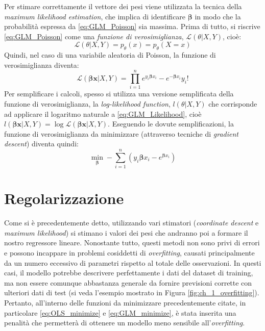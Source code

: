 Per stimare correttamente il vettore dei pesi viene utilizzata la tecnica della \textit{maximum likelihood 
estimation}, che implica di identificare $\bm{\beta}$ in modo che la probabilità espressa da \eqref{eq:GLM_Poisson} sia
massima. Prima di tutto, si riscrive \eqref{eq:GLM_Poisson} come una \textit{funzione di verosimiglianza}, $\mathcal{L}(\theta | X, Y)$, cioè:
\begin{equation}
\mathcal{L}(\theta | X, Y) = p_{\theta}(x) = p_{\theta}(X=x)
\end{equation}
Quindi, nel caso di una variabile aleatoria di Poisson, la funzione di verosimiglianza diventa:
\begin{equation}
\mathcal{L}(\bm{\beta x}  | X, Y ) = \prod_{i=1}^n {e^{y_i \bm{\beta} x_i}-e^{-\bm{\beta} x_i}}{y_i!} \label{eq:GLM_Likelihood}
\end{equation}
Per semplificare i calcoli, spesso si utilizza una versione semplificata della funzione di verosimiglianza, la \textit{log-likelihood function}, $l(\theta | X, Y)$ che corrisponde ad applicare il logaritmo naturale a \eqref{eq:GLM_Likelihood}, cioè 
$l(\bm{\beta x}  | X, Y) = \log{\mathcal{L}(\bm{\beta x}  | X, Y )}$. 
Eseguendo le dovute semplificazioni, la funzione di verosimiglianza da minimizzare (attraverso tecniche di \textit{gradient descent}) diventa quindi:
\begin{equation}
	\min_{\bm{\beta}} -\sum_{i=1}^n (y_i\bm{\beta} x_i - e^{\bm{\beta} x_i} ) \label{eq:GLM_minimize}
\end{equation} 

\section{Regolarizzazione}
\bigskip

Come si è precedentemente detto, utilizzando vari stimatori (\textit{coordinate descent} e \textit{maximum likelihood}) 
si stimano i valori dei pesi che andranno poi a formare il nostro regressore lineare. Nonostante tutto, questi metodi 
non sono privi di errori e possono incappare in problemi cosiddetti di \textit{overfitting}, causati principalmente da un 
numero eccessivo di parametri rispetto al totale delle osservazioni. In questi casi, il modello potrebbe descrivere 
perfettamente i dati del dataset di training, ma non essere comunque abbastanza generale da fornire previsioni corrette con 
ulteriori dati di test (si veda l'esempio mostrato in Figura \ref{fig:ch_1_overfitting}). 
Pertanto, all'interno delle funzioni da minimizzare precedentemente citate, in particolare \eqref{eq:OLS_minimize} e 
\eqref{eq:GLM_minimize}, è stata inserita una penalità che permetterà di ottenere un modello meno sensibile 
all'\textit{overfitting}. 
\bigskip 

